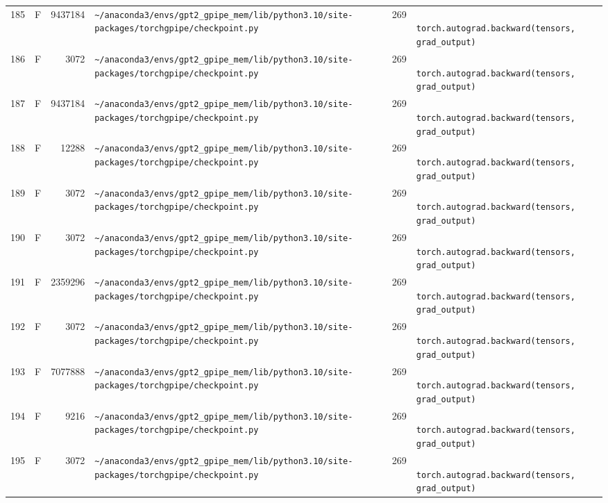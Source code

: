\documentclass{article}
\begin{document}
\begin{longtable}{r l r p{6.5cm} r p{7.0cm}}
185 & F & 9437184 & \lstinline|~/anaconda3/envs/gpt2_gpipe_mem/lib/python3.10/site-packages/torchgpipe/checkpoint.py| & 269 & \lstinline|            torch.autograd.backward(tensors, grad_output)| \\
186 & F & 3072 & \lstinline|~/anaconda3/envs/gpt2_gpipe_mem/lib/python3.10/site-packages/torchgpipe/checkpoint.py| & 269 & \lstinline|            torch.autograd.backward(tensors, grad_output)| \\
187 & F & 9437184 & \lstinline|~/anaconda3/envs/gpt2_gpipe_mem/lib/python3.10/site-packages/torchgpipe/checkpoint.py| & 269 & \lstinline|            torch.autograd.backward(tensors, grad_output)| \\
188 & F & 12288 & \lstinline|~/anaconda3/envs/gpt2_gpipe_mem/lib/python3.10/site-packages/torchgpipe/checkpoint.py| & 269 & \lstinline|            torch.autograd.backward(tensors, grad_output)| \\
189 & F & 3072 & \lstinline|~/anaconda3/envs/gpt2_gpipe_mem/lib/python3.10/site-packages/torchgpipe/checkpoint.py| & 269 & \lstinline|            torch.autograd.backward(tensors, grad_output)| \\
190 & F & 3072 & \lstinline|~/anaconda3/envs/gpt2_gpipe_mem/lib/python3.10/site-packages/torchgpipe/checkpoint.py| & 269 & \lstinline|            torch.autograd.backward(tensors, grad_output)| \\
191 & F & 2359296 & \lstinline|~/anaconda3/envs/gpt2_gpipe_mem/lib/python3.10/site-packages/torchgpipe/checkpoint.py| & 269 & \lstinline|            torch.autograd.backward(tensors, grad_output)| \\
192 & F & 3072 & \lstinline|~/anaconda3/envs/gpt2_gpipe_mem/lib/python3.10/site-packages/torchgpipe/checkpoint.py| & 269 & \lstinline|            torch.autograd.backward(tensors, grad_output)| \\
193 & F & 7077888 & \lstinline|~/anaconda3/envs/gpt2_gpipe_mem/lib/python3.10/site-packages/torchgpipe/checkpoint.py| & 269 & \lstinline|            torch.autograd.backward(tensors, grad_output)| \\
194 & F & 9216 & \lstinline|~/anaconda3/envs/gpt2_gpipe_mem/lib/python3.10/site-packages/torchgpipe/checkpoint.py| & 269 & \lstinline|            torch.autograd.backward(tensors, grad_output)| \\
195 & F & 3072 & \lstinline|~/anaconda3/envs/gpt2_gpipe_mem/lib/python3.10/site-packages/torchgpipe/checkpoint.py| & 269 & \lstinline|            torch.autograd.backward(tensors, grad_output)| \\

\end{longtable}
\end{document}
